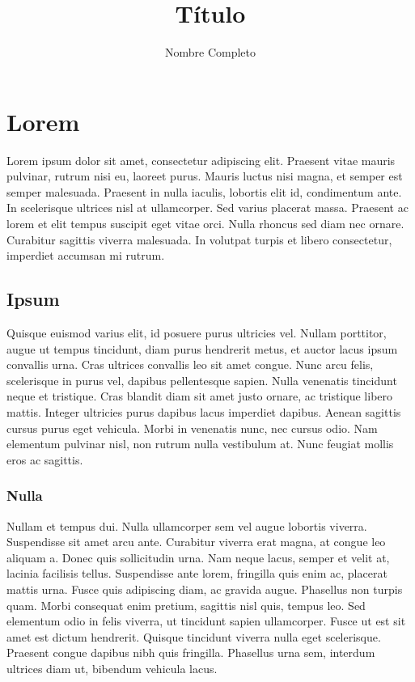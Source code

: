 \documentclass[a4paper,12pt]{article}
\title{Título}
\author{Nombre Completo}
\date{}
\begin{document}


\renewcommand{\contentsname}{\centering Índice}
\tableofcontents
\newpage


\section{Lorem}

Lorem ipsum dolor sit amet, consectetur adipiscing elit. Praesent vitae mauris pulvinar, rutrum nisi eu, laoreet purus. Mauris luctus nisi magna, et semper est semper malesuada. Praesent in nulla iaculis, lobortis elit id, condimentum ante. In scelerisque ultrices nisl at ullamcorper. Sed varius placerat massa. Praesent ac lorem et elit tempus suscipit eget vitae orci. Nulla rhoncus sed diam nec ornare. Curabitur sagittis viverra malesuada. In volutpat turpis et libero consectetur, imperdiet accumsan mi rutrum.

\subsection{Ipsum}
Quisque euismod varius elit, id posuere purus ultricies vel. Nullam porttitor, augue ut tempus tincidunt, diam purus hendrerit metus, et auctor lacus ipsum convallis urna. Cras ultrices convallis leo sit amet congue. Nunc arcu felis, scelerisque in purus vel, dapibus pellentesque sapien. Nulla venenatis tincidunt neque et tristique. Cras blandit diam sit amet justo ornare, ac tristique libero mattis. Integer ultricies purus dapibus lacus imperdiet dapibus. Aenean sagittis cursus purus eget vehicula. Morbi in venenatis nunc, nec cursus odio. Nam elementum pulvinar nisl, non rutrum nulla vestibulum at. Nunc feugiat mollis eros ac sagittis.

\subsubsection*{Nulla}
Nullam et tempus dui. Nulla ullamcorper sem vel augue lobortis viverra. Suspendisse sit amet arcu ante. Curabitur viverra erat magna, at congue leo aliquam a. Donec quis sollicitudin urna. Nam neque lacus, semper et velit at, lacinia facilisis tellus. Suspendisse ante lorem, fringilla quis enim ac, placerat mattis urna. Fusce quis adipiscing diam, ac gravida augue. Phasellus non turpis quam. Morbi consequat enim pretium, sagittis nisl quis, tempus leo. Sed elementum odio in felis viverra, ut tincidunt sapien ullamcorper. Fusce ut est sit amet est dictum hendrerit. Quisque tincidunt viverra nulla eget scelerisque. Praesent congue dapibus nibh quis fringilla. Phasellus urna sem, interdum ultrices diam ut, bibendum vehicula lacus.
\end{document}
